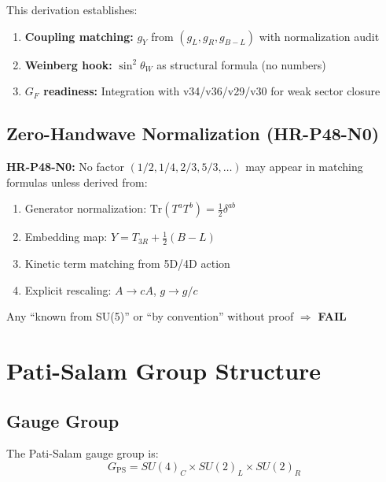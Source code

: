 \documentclass[11pt,a4paper]{article}
\begin{document}
This derivation establishes:
\begin{enumerate}
\item \textbf{Coupling matching:} $g_Y$ from $(g_L, g_R, g_{B-L})$ with normalization audit
\item \textbf{Weinberg hook:} $\sin^2\theta_W$ as structural formula (no numbers)
\item \textbf{$G_F$ readiness:} Integration with v34/v36/v29/v30 for weak sector closure
\end{enumerate}

\subsection{Zero-Handwave Normalization (HR-P48-N0)}
\label{subsec:zero-handwave}

\begin{tcolorbox}[colback=red!5!white,colframe=red!60!black,title=\textbf{HARD RULE: ZERO-HANDWAVE NORMALIZATION}]
\textbf{HR-P48-N0:} No factor $(1/2, 1/4, 2/3, 5/3, \ldots)$ may appear in
matching formulas unless derived from:
\begin{enumerate}
\item Generator normalization: $\mathrm{Tr}(T^a T^b) = \frac{1}{2}\delta^{ab}$
\item Embedding map: $Y = T_{3R} + \frac{1}{2}(B-L)$
\item Kinetic term matching from 5D/4D action
\item Explicit rescaling: $A \to cA$, $g \to g/c$
\end{enumerate}
Any ``known from SU(5)'' or ``by convention'' without proof $\Rightarrow$ \textbf{FAIL}
\end{tcolorbox}

\section{Pati-Salam Group Structure}
\label{sec:ps-structure}

\subsection{Gauge Group}
\label{subsec:gauge-group}

The Pati-Salam gauge group is:
\begin{equation}
\label{eq:ps-group}
G_{\text{PS}} = SU(4)_C \times SU(2)_L \times SU(2)_R
\end{equation}
\end{document}
